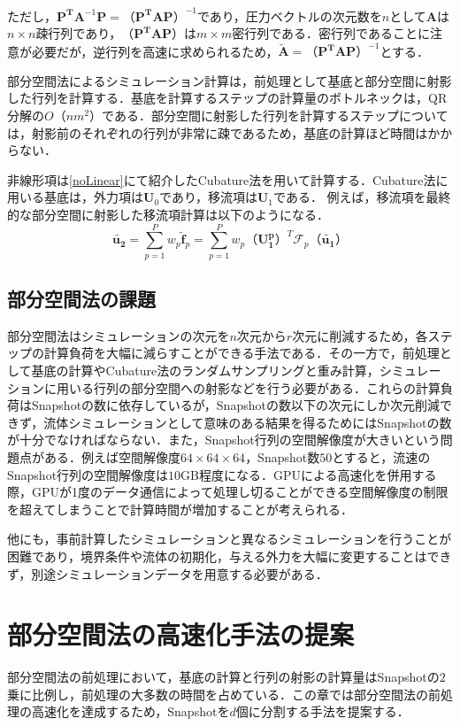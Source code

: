 \documentclass[a4j,12pt]{jreport}
\begin{document}
ただし，$\mathbf{P^T}\mathbf{A}^{-1}\mathbf{P} = （\mathbf{P^T}\mathbf{A}\mathbf{P}）^{-1}$であり，圧力ベクトルの次元数を$n$として$\mathbf{A}$は$n\times n$疎行列であり，$（\mathbf{P^T}\mathbf{A}\mathbf{P}）$は$m\times m$密行列である．密行列であることに注意が必要だが，逆行列を高速に求められるため，$\mathbf{\tilde{A}} = （\mathbf{P^T}\mathbf{A}\mathbf{P}）^{-1}$とする．

部分空間法によるシミュレーション計算は，前処理として基底と部分空間に射影した行列を計算する．基底を計算するステップの計算量のボトルネックは，QR分解の$O（nm^2）$である．部分空間に射影した行列を計算するステップについては，射影前のそれぞれの行列が非常に疎であるため，基底の計算ほど時間はかからない．

非線形項は\ref{noLinear}にて紹介したCubature法を用いて計算する．Cubature法に用いる基底は，外力項は$\mathbf{U}_0$であり，移流項は$\mathbf{U}_1$である．
例えば，移流項を最終的な部分空間に射影した移流項計算は以下のようになる．
\[
	\bm{\tilde{u_2}} = \sum_{p=1}^Pw_p\bm{\tilde{f}}_p =   \sum_{p=1}^Pw_p（\mathbf{U^p_1}）^T\mathcal{F}_p（\bm{\tilde{u_1}}）
\]

\section{部分空間法の課題}
部分空間法はシミュレーションの次元を$n$次元から$r$次元に削減するため，各ステップの計算負荷を大幅に減らすことができる手法である．その一方で，前処理として基底の計算やCubature法のランダムサンプリングと重み計算，シミュレーションに用いる行列の部分空間への射影などを行う必要がある．これらの計算負荷はSnapshotの数に依存しているが，Snapshotの数以下の次元にしか次元削減できず，流体シミュレーションとして意味のある結果を得るためにはSnapshotの数が十分でなければならない．また，Snapshot行列の空間解像度が大きいという問題点がある．例えば空間解像度$64\times64\times64$，Snapshot数$50$とすると，流速のSnapshot行列の空間解像度は$10$GB程度になる．GPUによる高速化を併用する際，GPUが1度のデータ通信によって処理し切ることができる空間解像度の制限を超えてしまうことで計算時間が増加することが考えられる．

他にも，事前計算したシミュレーションと異なるシミュレーションを行うことが困難であり，境界条件や流体の初期化，与える外力を大幅に変更することはできず，別途シミュレーションデータを用意する必要がある．

\chapter{部分空間法の高速化手法の提案} \label{chapter:3}
部分空間法の前処理において，基底の計算と行列の射影の計算量はSnapshotの$2$乗に比例し，前処理の大多数の時間を占めている．この章では部分空間法の前処理の高速化を達成するため，Snapshotを$d$個に分割する手法を提案する．
\end{document}
